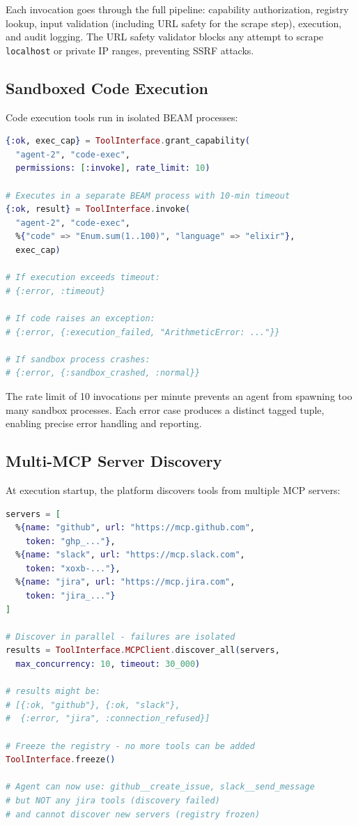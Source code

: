 \documentclass[12pt,a4paper]{article}
\theoremstyle{plain}
\theoremstyle{definition}
\begin{document}
Each invocation goes through the full pipeline: capability authorization, registry lookup, input validation (including URL safety for the scrape step), execution, and audit logging. The URL safety validator blocks any attempt to scrape \texttt{localhost} or private IP ranges, preventing SSRF attacks.

\subsection{Sandboxed Code Execution}

Code execution tools run in isolated BEAM processes:

\begin{lstlisting}[language=elixir, caption={Sandboxed code execution with timeout.}, label={lst:code-exec}]
{:ok, exec_cap} = ToolInterface.grant_capability(
  "agent-2", "code-exec",
  permissions: [:invoke], rate_limit: 10)

# Executes in a separate BEAM process with 10-min timeout
{:ok, result} = ToolInterface.invoke(
  "agent-2", "code-exec",
  %{"code" => "Enum.sum(1..100)", "language" => "elixir"},
  exec_cap)

# If execution exceeds timeout:
# {:error, :timeout}

# If code raises an exception:
# {:error, {:execution_failed, "ArithmeticError: ..."}}

# If sandbox process crashes:
# {:error, {:sandbox_crashed, :normal}}
\end{lstlisting}

The rate limit of 10 invocations per minute prevents an agent from spawning too many sandbox processes. Each error case produces a distinct tagged tuple, enabling precise error handling and reporting.

\subsection{Multi-MCP Server Discovery}

At execution startup, the platform discovers tools from multiple MCP servers:

\begin{lstlisting}[language=elixir, caption={Multi-server MCP discovery and freeze.}, label={lst:multi-mcp}]
servers = [
  %{name: "github", url: "https://mcp.github.com",
    token: "ghp_..."},
  %{name: "slack", url: "https://mcp.slack.com",
    token: "xoxb-..."},
  %{name: "jira", url: "https://mcp.jira.com",
    token: "jira_..."}
]

# Discover in parallel - failures are isolated
results = ToolInterface.MCPClient.discover_all(servers,
  max_concurrency: 10, timeout: 30_000)

# results might be:
# [{:ok, "github"}, {:ok, "slack"},
#  {:error, "jira", :connection_refused}]

# Freeze the registry - no more tools can be added
ToolInterface.freeze()

# Agent can now use: github__create_issue, slack__send_message
# but NOT any jira tools (discovery failed)
# and cannot discover new servers (registry frozen)
\end{lstlisting}
\end{document}
